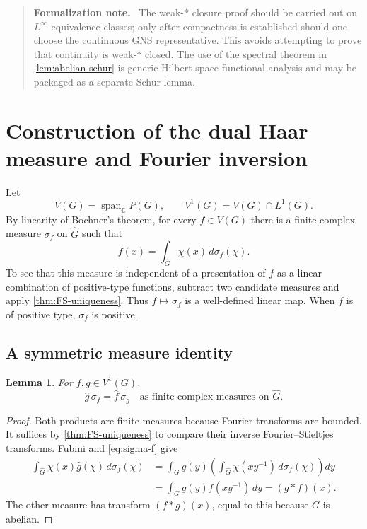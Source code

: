 \documentclass[11pt]{article}
\newtheorem{lemma}[theorem]{Lemma}
\theoremstyle{definition}
\theoremstyle{remark}
\newcommand{\C}{\mathbb C}
\newcommand{\Span}{\operatorname{span}}
\newcommand{\Lp}[1]{L^{#1}}
\newcommand{\dual}[1]{\widehat{#1}}
\newenvironment{formalization}
  {\begin{quote}\small\noindent\textbf{Formalization note.}\ }
  {\end{quote}}
\begin{document}
\begin{formalization}
The weak-$*$ closure proof should be carried out on $\Lp\infty$ equivalence classes; only
after compactness is established should one choose the continuous GNS representative.
This avoids attempting to prove that continuity is weak-$*$ closed.  The use of the
spectral theorem in \cref{lem:abelian-schur} is generic Hilbert-space functional analysis
and may be packaged as a separate Schur lemma.
\end{formalization}

\section{Construction of the dual Haar measure and Fourier inversion}
\label{sec:inversion}

Let
\[
 V(G)=\Span_\C P(G),\qquad V^1(G)=V(G)\cap\Lp1(G).
\]
By linearity of Bochner's theorem, for every $f\in V(G)$ there is a finite complex
measure $\sigma_f$ on $\dual G$ such that
\begin{equation}
  f(x)=\int_{\dual G}\chi(x)\,d\sigma_f(\chi).
  \label{eq:sigma-f}
\end{equation}
To see that this measure is independent of a presentation of $f$ as a linear combination
of positive-type functions, subtract two candidate measures and apply
\cref{thm:FS-uniqueness}.  Thus $f\mapsto\sigma_f$ is a well-defined linear map.  When
$f$ is of positive type, $\sigma_f$ is positive.

\subsection{A symmetric measure identity}

\begin{lemma}
\label{lem:symmetric-measure-identity}
For $f,g\in V^1(G)$,
\begin{equation}
  \widehat g\,\sigma_f=\widehat f\,\sigma_g
  \quad\text{as finite complex measures on }\dual G.
  \label{eq:symmetric-measure-identity}
\end{equation}
\end{lemma}

\begin{proof}
Both products are finite measures because Fourier transforms are bounded.  It suffices by
\cref{thm:FS-uniqueness} to compare their inverse Fourier--Stieltjes transforms.  Fubini
and \eqref{eq:sigma-f} give
\begin{align*}
 \int_{\dual G}\chi(x)\widehat g(\chi)\,d\sigma_f(\chi)
 &=\int_Gg(y)
    \left(\int_{\dual G}\chi(xy^{-1})\,d\sigma_f(\chi)\right)dy\\
 &=\int_Gg(y)f(xy^{-1})\,dy=(g*f)(x).
\end{align*}
The other measure has transform $(f*g)(x)$, equal to this because $G$ is abelian.
\end{proof}
\end{document}
